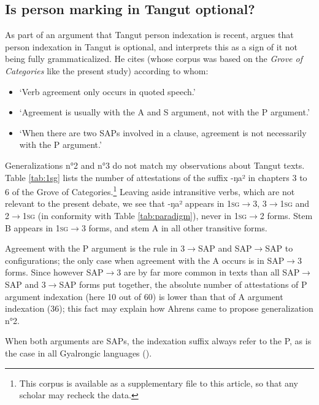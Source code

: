 \documentclass[oldfontcommands,oneside,a4paper,11pt]{article}
\newcommand{\ipa}[1]{{\phon \mbox{#1}}} %
\begin{document}
\subsection{Is person marking in Tangut optional?} \label{sec:optional}
As part of an argument that Tangut person indexation is recent, 
\citet{lapolla92} argues that person indexation in Tangut is optional, and interprets this as a sign of it not being fully grammaticalized. He cites  \citet{ahrens90tangut} (whose corpus was based on the \textit{Grove of Categories} like the present study) according to whom:

\begin{itemize}
\item `Verb agreement only occurs in quoted speech.'
\item `Agreement is usually with the A and S argument, not with the P argument.'
\item `When there are two SAPs involved in a clause, agreement is not necessarily with the P argument.'
\end{itemize}

Generalizations n°2 and n°3 do not match my observations about Tangut texts. Table \ref{tab:1sg} lists the number of attestations of the suffix  \ipa{-ŋa²} in chapters 3 to 6 of the Grove of Categories.\footnote{This corpus is available as a supplementary file to this article, so that any scholar may recheck the data.} Leaving aside intransitive verbs, which are not relevant to the present debate, we see that \ipa{-ŋa²} appears in \textsc{1sg}$\rightarrow$3, 3$\rightarrow$\textsc{1sg} and 2$\rightarrow$\textsc{1sg} (in conformity with Table \ref{tab:paradigm}), never in \textsc{1sg}$\rightarrow$2 forms. Stem B appears  in \textsc{1sg}$\rightarrow$3 forms, and stem A in all other transitive forms. 

Agreement with the P argument is the rule in 3$\rightarrow$SAP and SAP$\rightarrow$SAP to configurations; the only case when agreement with the A occurs is in SAP$\rightarrow$3 forms. Since however SAP$\rightarrow$3 are by far more common in texts than all SAP$\rightarrow$SAP and 3$\rightarrow$SAP forms put together, the absolute number of attestations of P argument indexation (here 10 out of 60) is lower than that of A argument indexation (36); this fact may explain how Ahrens came to propose generalization n°2.

When both arguments are SAPs, the indexation suffix always refer to the P, as is the case in all Gyalrongic languages (\citealt{jackson03caodeng, jacques10inverse, gongxun14agreement, lai15person}). 
\end{document}
